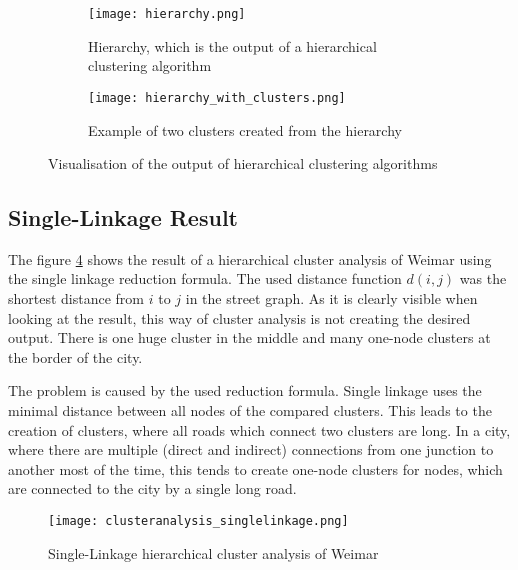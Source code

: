\begin{figure}
    \centering
    \begin{subfigure}[b]{\textwidth}
        \begin{mdframed}[style=border]
            \texttt{[image: hierarchy.png]}
        \end{mdframed}
        \caption{Hierarchy, which is the output of a hierarchical clustering algorithm}
        \label{fig:hierarchy}
    \end{subfigure}
    \par\medskip
    \begin{subfigure}[b]{\textwidth}
        \begin{mdframed}[style=border]
            \texttt{[image: hierarchy\_with\_clusters.png]}
        \end{mdframed}
    \caption{Example of two clusters created from the hierarchy}
    \label{fig:hierarchy_with_clusters}
    \end{subfigure}
    \caption{Visualisation of the output of hierarchical clustering algorithms}
\end{figure}

\subsection{Single-Linkage Result}
The figure \ref{fig:SingleLinkage} shows the result of a hierarchical cluster analysis of Weimar using the single linkage reduction formula. The used distance function $d(i, j)$ was the shortest distance from $i$ to $j$ in the street graph. As it is clearly visible when looking at the result, this way of cluster analysis is not creating the desired output. There is one huge cluster in the middle and many one-node clusters at the border of the city.

The problem is caused by the used reduction formula. Single linkage uses the minimal distance between all nodes of the compared clusters. This leads to the creation of clusters, where all roads which connect two clusters are long. In a city, where there are multiple (direct and indirect) connections from one junction to another most of the time, this tends to create one-node clusters for nodes, which are connected to the city by a single long road.

\begin{figure}[!ht]
    \centering
    \begin{mdframed}[style=mdthight]
        \texttt{[image: clusteranalysis\_singlelinkage.png]}
    \end{mdframed}
    \caption{Single-Linkage hierarchical cluster analysis of Weimar\label{fig:SingleLinkage}}
\end{figure}

